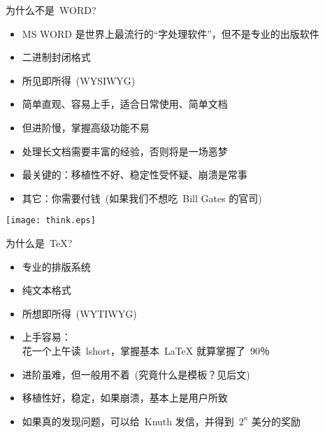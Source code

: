 \documentclass[dvipsnames, svgnames, mode=present, paper=screen, size=9pt,
style=husky]{powerdot}
\begin{document}
\begin{CJK*}{GBK}{song}
\begin{slide}{为什么不是~WORD?}
  \begin{itemize}
  \item MS WORD 是世界上最流行的“字处理软件”，但不是专业的出版软件
  \item 二进制封闭格式
  \item 所见即所得~(WYSIWYG)
  \item 简单直观、容易上手，适合日常使用、简单文档
  \item 但进阶慢，掌握高级功能不易
  \item 处理长文档需要丰富的经验，否则将是一场恶梦
  \item 最关键的：移植性不好、稳定性受怀疑、崩溃是常事
  \item 其它：你需要付钱~(如果我们不想吃~Bill Gates 的官司)
  \end{itemize}
  \bigskip
\centering
\texttt{[image: think.eps]}
\end{slide}

\begin{slide}{为什么是~\TeX ?}
  \begin{itemize}
  \item 专业的排版系统\\

  \item 纯文本格式 
  \item 所想即所得~(WYTIWYG)
  \item 上手容易：\\
        花一个上午读~lshort，掌握基本~\LaTeX{} 就算掌握了~90％
  \item 进阶虽难，但一般用不着~(究竟什么是模板？见后文)
  \item 移植性好，稳定，如果崩溃，基本上是用户所致
  \item 如果真的发现问题，可以给~Knuth 发信，并得到~{\color{blue}$2^{n}$} 美分的奖励
  \end{itemize}
\end{slide}


\end{CJK*}
\end{document}
